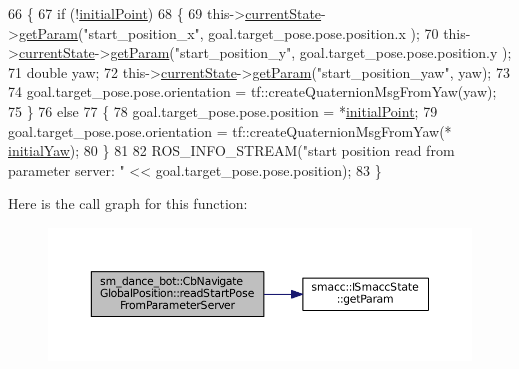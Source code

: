 \begin{DoxyCode}
66   \{
67     \textcolor{keywordflow}{if} (!\hyperlink{classsm__dance__bot_1_1CbNavigateGlobalPosition_a7774933671827d6111b3d7e139f56ca7}{initialPoint})
68     \{
69       this->\hyperlink{classsmacc_1_1SmaccClientBehavior_af76fc9b877542ed5caf033f820c107d0}{currentState}->\hyperlink{classsmacc_1_1ISmaccState_abbb3a24b912c6e8de28f7b86123b6357}{getParam}(\textcolor{stringliteral}{"start\_position\_x"}, goal.target\_pose.pose.position.x
      );
70       this->\hyperlink{classsmacc_1_1SmaccClientBehavior_af76fc9b877542ed5caf033f820c107d0}{currentState}->\hyperlink{classsmacc_1_1ISmaccState_abbb3a24b912c6e8de28f7b86123b6357}{getParam}(\textcolor{stringliteral}{"start\_position\_y"}, goal.target\_pose.pose.position.y
      );
71       \textcolor{keywordtype}{double} yaw;
72       this->\hyperlink{classsmacc_1_1SmaccClientBehavior_af76fc9b877542ed5caf033f820c107d0}{currentState}->\hyperlink{classsmacc_1_1ISmaccState_abbb3a24b912c6e8de28f7b86123b6357}{getParam}(\textcolor{stringliteral}{"start\_position\_yaw"}, yaw);
73 
74       goal.target\_pose.pose.orientation = tf::createQuaternionMsgFromYaw(yaw);
75     \}
76     \textcolor{keywordflow}{else}
77     \{
78       goal.target\_pose.pose.position = *\hyperlink{classsm__dance__bot_1_1CbNavigateGlobalPosition_a7774933671827d6111b3d7e139f56ca7}{initialPoint};
79       goal.target\_pose.pose.orientation = tf::createQuaternionMsgFromYaw(*
      \hyperlink{classsm__dance__bot_1_1CbNavigateGlobalPosition_ab7aebde14030bf36949d85f13ce3a685}{initialYaw});
80     \}
81 
82     ROS\_INFO\_STREAM(\textcolor{stringliteral}{"start position read from parameter server: "} << goal.target\_pose.pose.position);
83   \}
\end{DoxyCode}


Here is the call graph for this function\+:
\nopagebreak
\begin{figure}[H]
\begin{center}
\leavevmode
\includegraphics[width=350pt]{classsm__dance__bot_1_1CbNavigateGlobalPosition_a81b78925b3ab8a426f471cb74d0b9756_cgraph}
\end{center}
\end{figure}




